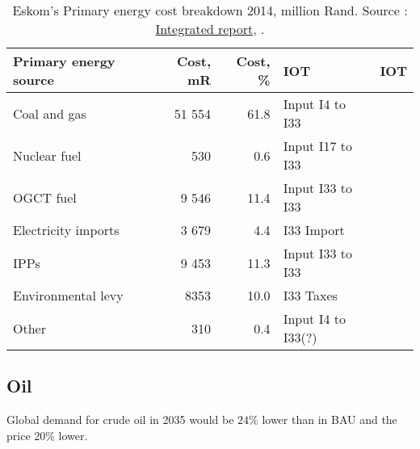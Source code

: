 \documentclass[12pt,english]{article}
\begin{document}
\begin{table}[ht]
	\centering
	\begin{tabular}{lrrlr}
		\toprule
		Primary energy source	& Cost, mR  & Cost, \% & IOT  & IOT\\ 
		\midrule
		Coal and gas & 51 554   &  61.8   & Input I4 to I33 &\\
		Nuclear  fuel &  530  &   0.6  & Input I17 to I33& \\
		OGCT fuel & 9 546   &   11.4   & Input I33 to I33  & \\
		Electricity  imports & 3 679   &  4.4  & I33 Import & \\
		IPPs &  9 453  &  11.3  & Input I33 to I33 & \\
		Environmental levy & 8353 &   10.0   & I33 Taxes & \\
		Other &  310  &  0.4  & Input I4 to I33(?) 	& \\
		\bottomrule
	\end{tabular}
	\caption{\label{EskomPrimaryEnergy}Eskom's Primary energy cost breakdown 2014, million Rand. Source : \href{http://www.eskom.co.za/IR2015/Documents/EskomIR2015single.pdf}{Integrated report}, \citep{Eskom2014AR}.}
\end{table}




\subsection{Oil}

Global demand for crude oil in 2035 would be $24\%$ lower than in BAU and the price $20\%$ lower. 




\clearpage

\newpage


\clearpage
\end{document}
